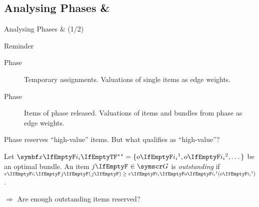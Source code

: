 \subsection{Analysing Phases \texorpdfstring{\phasei{} \& \phaseiii}{I \& III}}
\begin{frame}{Analysing Phases \phasei{} \& \phaseiii{} (1/2)}
	\adjustfortopblock
	\begin{block}{Reminder\vphantom{(15)}}
		\begin{description}
			\item[Phase \phasei]
			Temporary assignments.
			Valuations of single items as edge weights.

			\item[Phase \phaseiii]
			Items of phase \phasei{} released.
			Valuations of items and bundles from phase \phaseii{} as edge weights.
		\end{description}
	\end{block}

	Phase \phasei{} reserves \enquote{high-value} items.
	But what qualifies as \enquote{high-value}?

	\begin{definition}[14]
		Let \(\alloc* = \{ \asgd*{1}, \asgd*{2}, \dots\}\) be an optimal bundle.
		An item \(\genericitem \in \goods\) is \emph{outstanding} if \(\valuations[ \hairspace \genericitem] \ge \valuations[\asgd*{1}]\).
	\end{definition}

	\(\Rightarrow\) Are enough outstanding items reserved?
\end{frame}





